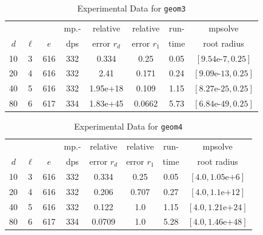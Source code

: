 \documentclass[runningheads]{llncs}
\begin{document}
\begin{table}
\caption{Experimental Data for \texttt{geom3}} %
\label{tab:geom3}
\vskip -0.15in
\begin{center}
\begin{small}
\begin{sc}
\begin{tabular}{rccccccc}
\toprule
&  &  & mp.-& relative  & relative & run- & mpsolve \\
$d~$& $\ell$& $e$ & dps&error $r_d$       & error $r_1$ &time& root radius\\
\midrule
 10 & 3 & 616 & 332 & 0.334 & 0.25 & 0.05 & $[9.54\text{e-}7, 0.25]$\\
 20 & 4 & 616 & 332 & 2.41 & 0.171 & 0.24 & $[9.09\text{e-}13, 0.25]$\\
 40 & 5 & 616 & 332 & 1.95e+18 & 0.109 & 1.15 & $[8.27\text{e-}25, 0.25]$\\
 80 & 6 & 617 & 334 & 1.83e+45 & 0.0662 & 5.73 & $[6.84\text{e-}49, 0.25]$\\
\bottomrule
\end{tabular}
\end{sc}
\end{small}
\end{center}
\vskip 0.05in
\end{table}


\begin{table}
\caption{Experimental Data for \texttt{geom4}} %
\label{tab:geom4}
\vskip -0.15in
\begin{center}
\begin{small}
\begin{sc}
\begin{tabular}{rccccccc}
\toprule
&  &  & mp.-& relative  & relative & run- & mpsolve \\
$d~$& $\ell$& $e$ & dps&error $r_d$       & error $r_1$ &time& root radius\\
\midrule
 10 & 3 & 616 & 332 & 0.334 & 0.25 & 0.05 & $[4.0, 1.05\text{e+}6]$\\
 20 & 4 & 616 & 332 & 0.206 & 0.707 & 0.27 & $[4.0, 1.1\text{e+}12]$\\
 40 & 5 & 616 & 332 & 0.122 & 1.0 & 1.15 & $[4.0, 1.21\text{e+}24]$\\
 80 & 6 & 617 & 334 & 0.0709 & 1.0 & 5.28 & $[4.0, 1.46\text{e+}48]$\\
\bottomrule
\end{tabular}
\end{sc}
\end{small}
\end{center}
\vskip 0.05in
\end{table}
\end{document}
